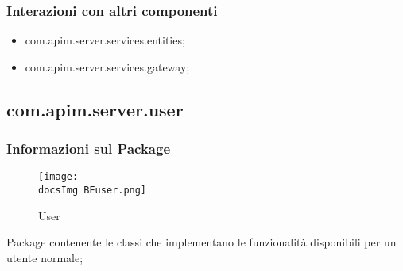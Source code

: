 {{{          \subsubsection{Interazioni con altri componenti}
          \begin{itemize}
          \item com.apim.server.services.entities;
          \item com.apim.server.services.gateway;
          \end{itemize}
  }
    \subsection{com.apim.server.user}{
    \subsubsection{Informazioni sul Package}
        \begin{figure}[ht] 									
          \centering
          \texttt{[image: \\docsImg BEuser.png]}
          \caption{User}
          \label{User}
        \end{figure}
        Package  contenente le classi che implementano le funzionalità disponibili per un utente normale;
}}}
